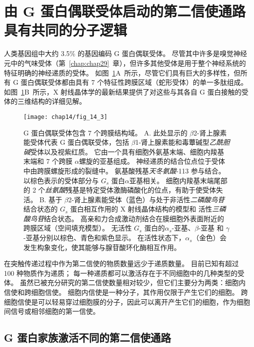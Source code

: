 \section{由 G 蛋白偶联受体启动的第二信使通路具有共同的分子逻辑}

人类基因组中大约 3.5\% 的基因编码 G 蛋白偶联受体。
尽管其中许多是嗅觉神经元中的气味受体（第~\ref{chap:chap29}~章），但许多其他受体是用于整个神经系统的特征明确的神经递质的受体。
如图~\ref{fig:14_3}A~所示，尽管它们具有巨大的多样性，但所有 G 蛋白偶联受体都由具有 7 个特征性跨膜区域（蛇形受体）的单一多肽组成。
如图~\ref{fig:14_3}B~所示，X 射线晶体学的最新结果提供了对这些与其各自 G 蛋白接触的受体的三维结构的详细见解。


\begin{figure}[htbp]
	\centering
	\texttt{[image: chap14/fig\_14\_3]}
	\caption{G 蛋白偶联受体包含 7 个跨膜结构域。
		A. 此处显示的 $\beta$2-肾上腺素能受体代表 G 蛋白偶联受体，包括 $\beta$1-肾上腺素能和毒蕈碱型\textit{乙酰胆碱}受体以及视紫红质。
		它由一个具有细胞外氨基末端、细胞内羧基末端和 7 个跨膜 $\alpha$螺旋的亚基组成。
		神经递质的结合位点位于受体中由跨膜螺旋形成的裂缝中。
		氨基酸残基\textit{天冬氨酸}-113 参与结合。
		以棕色表示的受体部分与 $ G_s $ 蛋白$\alpha$亚基相关。
		细胞内羧基末端尾部的 2 个\textit{丝氨酸}残基是特定受体激酶磷酸化的位点，有助于使受体失活\cite{frielle1989beta}。
		B. 基于 $\beta$2-肾上腺素能受体（蓝色）与处于非活性\textit{二磷酸鸟苷}结合状态的 $ G_s $ 蛋白相互作用的 X 射线晶体结构的模型和 活性\textit{三磷酸鸟苷}结合状态。
		高亲和力合成激动剂结合在膜细胞外表面附近的跨膜区域（空间填充模型）。
		无活性 $ G_s $ 蛋白的$\alpha_s$-亚基、$\beta$-亚基 和 $\gamma$-亚基分别以棕色、青色和紫色显示。
		在活性状态下，$\alpha_s$（金色）会发生构象变化，使其能够与腺苷酸环化酶相互作用\cite{kobilka2013structural}。}
	\label{fig:14_3}
\end{figure}


在突触传递过程中作为第二信使的物质数量远少于递质数量。
目前已知有超过 100 种物质作为递质；
每一种递质都可以激活存在于不同细胞中的几种类型的受体。
虽然已被充分研究的第二信使数量相对较少，但它们主要分为两类：细胞内信使和跨细胞信使。
细胞内信使是一种分子，其作用仅限于产生它们的细胞。
跨细胞信使是可以轻易穿过细胞膜的分子，因此可以离开产生它们的细胞，作为细胞间信号或相邻细胞的第一信使。


\subsection{G 蛋白家族激活不同的第二信使通路}

